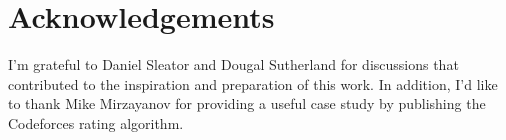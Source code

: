 \documentclass{article}
\begin{document}
\section*{Acknowledgements}

I'm grateful to Daniel Sleator and Dougal Sutherland for discussions that contributed to the inspiration and preparation of this work. In addition, I'd like to thank Mike Mirzayanov for providing a useful case study by publishing the Codeforces rating algorithm.



\end{document}
